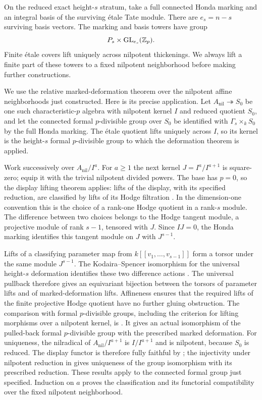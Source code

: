 On the reduced exact height-$s$ stratum, take a full connected Honda
marking and an integral basis of the surviving \'etale Tate module.
There are $e_s=n-s$ surviving basis vectors.  The marking and basis
towers have group
\[
 P_s\times\operatorname{GL}_{e_s}(\mathbb Z_p).
\]
Finite \'etale covers lift uniquely across nilpotent thickenings.  We
always lift a finite part of these towers to a fixed nilpotent
neighborhood before making further constructions.

We use the relative marked-deformation theorem over the nilpotent
affine neighborhoods just constructed.  Here is its precise
application.  Let $A_{\mathrm{nil}}\twoheadrightarrow S_0$ be one
such characteristic-$p$ algebra with nilpotent kernel $I$ and reduced
quotient $S_0$, and let
the connected formal $p$-divisible group over $S_0$ be identified
with $\Gamma_s\times_k S_0$ by the full Honda marking.  The
\'etale quotient lifts uniquely across $I$, so its kernel is the
height-$s$ formal $p$-divisible group to which the deformation theorem
is applied.

Work successively over $A_{\mathrm{nil}}/I^a$.  For $a\geq1$ the
next kernel $J=I^a/I^{a+1}$ is square-zero; equip it with the trivial
nilpotent divided powers.  The base has $p=0$, so the display
lifting theorem applies: lifts of the display, with its specified
reduction, are classified by lifts of its Hodge filtration
\cite[Theorem~48 and Corollary~49]{ZinkDisplays}.  In the
dimension-one convention this is the choice of a rank-one Hodge
quotient in a rank-$s$ module.  The difference between two choices
belongs to the Hodge tangent module, a projective module of rank
$s-1$, tensored with $J$.  Since $IJ=0$, the Honda marking
identifies this tangent module on $J$ with $J^{s-1}$.

Lifts of a classifying parameter map from
$k[[v_1,\ldots,v_{s-1}]]$ form a torsor under the same module
$J^{s-1}$.  The Kodaira--Spencer isomorphism for the universal
height-$s$ deformation identifies these two difference actions
\cite[Section~5, pp.~226--227]{Lau2010Tate}.
The universal pullback therefore gives an equivariant bijection
between the torsors of parameter lifts and of marked-deformation
lifts.  Affineness ensures that the required lifts of the finite
projective Hodge quotient have no further gluing obstruction.
The comparison with formal $p$-divisible groups, including the
criterion for lifting morphisms over a nilpotent kernel, is
\cite[Corollary~95]{ZinkDisplays}.  It gives an actual isomorphism
of the pulled-back formal $p$-divisible group with the prescribed
marked deformation. For uniqueness, the nilradical of
$A_{\mathrm{nil}}/I^{a+1}$ is $I/I^{a+1}$ and is nilpotent, because
$S_0$ is reduced. The display functor is therefore fully faithful
by \cite[Proposition~99]{ZinkDisplays}; the injectivity under
nilpotent reduction in \cite[Proposition~40]{ZinkDisplays} gives
uniqueness of the group isomorphism with its prescribed reduction.
These results apply to the connected formal group just specified.
Induction on $a$
proves the classification and its functorial compatibility over
the fixed nilpotent neighborhood.

